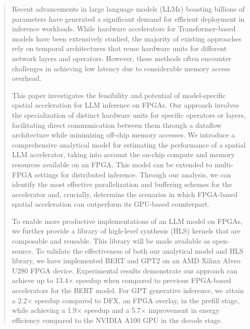\begin{abstract}
Recent advancements in large language models (LLMs) boasting billions of parameters have generated a significant demand for efficient deployment in inference workloads. While hardware accelerators for Transformer-based models have been extensively studied, the majority of existing approaches rely on temporal architectures that reuse hardware units for different network layers and operators.
However, these methods often encounter challenges in achieving low latency due to considerable memory access overhead.

This paper investigates the feasibility and potential of model-specific spatial acceleration for LLM inference on FPGAs. Our approach involves the specialization of distinct hardware units for specific operators or layers, facilitating direct communication between them through a dataflow architecture while minimizing off-chip memory accesses. We introduce a comprehensive analytical model for estimating the performance of a spatial LLM accelerator, taking into account the on-chip compute and memory resources available on an FPGA. This model can be extended to multi-FPGA settings for distributed inference. Through our analysis, we can identify the most effective parallelization and buffering schemes for the accelerator and, crucially, determine the scenarios in which FPGA-based spatial acceleration can outperform its GPU-based counterpart.

To enable more productive implementations of an LLM model on FPGAs, we further provide a library of high-level synthesis (HLS) kernels that are composable and reusable.
This library will be made available as open-source.
To validate the effectiveness of both our analytical model and HLS library, we have implemented BERT and GPT2 on an AMD Xilinx Alveo U280 FPGA device.
Experimental results demonstrate our approach can achieve up to 13.4$\times$ speedup when compared to previous FPGA-based accelerators for the BERT model.
For GPT generative inference, we attain a 2.2$\times$ speedup compared to DFX, an FPGA overlay, in the prefill stage, while achieving a 1.9$\times$ speedup and a 5.7$\times$ improvement in energy efficiency compared to the NVIDIA A100 GPU in the decode stage.
\end{abstract}
